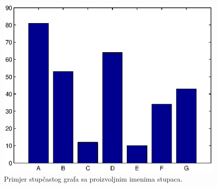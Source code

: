 \documentclass[a4paper, 10pt]{article}
\begin{document}
\begin{figure}[!htb]
\centering
\includegraphics[width=\linewidth]{slike/bar_imenovan.eps}
\caption{Primjer stupčastog grafa sa proizvoljnim imenima stupaca.}
\label{fig:bar_imenovan}
\end{figure}

\end{document}
